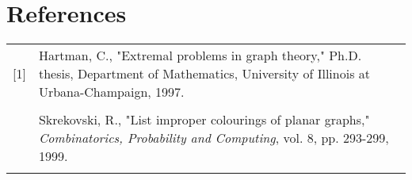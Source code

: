 \documentclass[11pt,letter]{article}
\begin{document}
\begin{comment}
\noindent We set $P$ to be the single vertex path $x$ and use continue\_path$(P)$ to find the desired path.
Then we color $P$, setting $\lambda(v)=c$ for all $v\in P$.\\

\section{Algorithm}

Let $P=c_0c_1\ldots c_i$ be the path clockwise along the outer face connecting $x=c_0$ and $y=c_i$.
Let $N(v)[u,v]$ denote the list of neighbors of $v$ from $u$ to $v$, inclusive, in clockwise embedded order. We
denote $N(v)(u,v)$ 
\end{comment}

\section*{References}

\begin{tabularx}{\linewidth}{lX}
[1] & Hartman, C., "Extremal problems in graph theory," Ph.D. thesis, Department of Mathematics,
University of Illinois at Urbana-Champaign, 1997.\\\\\relax
[2] & Skrekovski, R., "List improper colourings of planar graphs,"
\emph{Combinatorics, Probability and Computing}, vol. 8, pp. 293-299, 1999.\\\relax
\end{tabularx}

\begin{comment}
[3] & Eaton, N., N. Hull, "Defective list colorings of planar graphs,"
\emph{Bulletin of the Institute for Combinatorics and its Applications}, 1999.\\\relax
[4] & Poh, K., "On the linear vertex-arboricity of a planar graph," \emph{Journal of Graph Theory},
vol. 14, pp. 73-75, 1990\\\relax
[5] & Kant, G., "Algorithms for drawing planar graphs," Ph.D. thesis, Department of Computer Science,
Utrecht University, 1993.\\\relax
[6] & Tarjan, R., "Depth-first search and linear graph algorithms," SIAM Journal on Computing, vol. 1, pp.
146-160, 1972.\\\relax
\end{comment}
\end{document}
